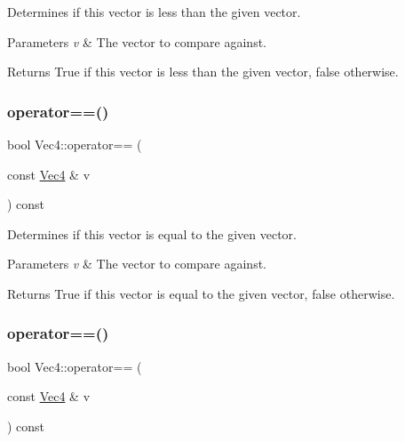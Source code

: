Determines if this vector is less than the given vector.


\begin{DoxyParams}{Parameters}
{\em v} & The vector to compare against.\\
\hline
\end{DoxyParams}
\begin{DoxyReturn}{Returns}
True if this vector is less than the given vector, false otherwise. 
\end{DoxyReturn}
\mbox{\label{classVec4_aee56eb96539827efc62ff4d9fde66c67}} 
\subsubsection{\texorpdfstring{operator==()}{operator==()}\hspace{0.1cm}{\footnotesize\ttfamily [1/2]}}
{\footnotesize\ttfamily bool Vec4\+::operator== (\begin{DoxyParamCaption}\item[{const \hyperlink{classVec4}{Vec4} \&}]{v }\end{DoxyParamCaption}) const\hspace{0.3cm}{\ttfamily [inline]}}

Determines if this vector is equal to the given vector.


\begin{DoxyParams}{Parameters}
{\em v} & The vector to compare against.\\
\hline
\end{DoxyParams}
\begin{DoxyReturn}{Returns}
True if this vector is equal to the given vector, false otherwise. 
\end{DoxyReturn}
\mbox{\label{classVec4_aee56eb96539827efc62ff4d9fde66c67}} 
\subsubsection{\texorpdfstring{operator==()}{operator==()}\hspace{0.1cm}{\footnotesize\ttfamily [2/2]}}
{\footnotesize\ttfamily bool Vec4\+::operator== (\begin{DoxyParamCaption}\item[{const \hyperlink{classVec4}{Vec4} \&}]{v }\end{DoxyParamCaption}) const\hspace{0.3cm}{\ttfamily [inline]}}

